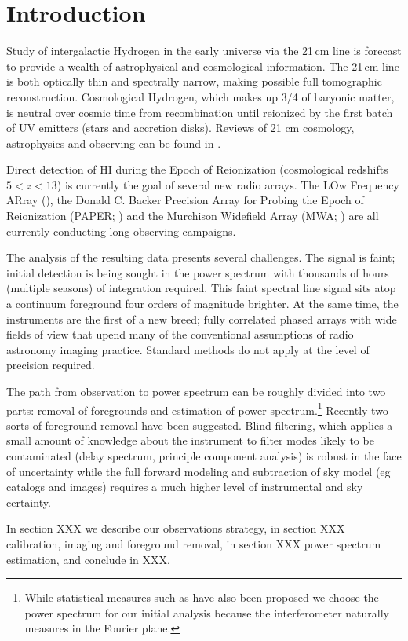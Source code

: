 \section{Introduction} 
  Study of intergalactic Hydrogen  in the early universe via the 21\,cm line is forecast to provide a wealth of astrophysical and cosmological information.  The 21\,cm line is both optically thin and spectrally narrow, making possible full tomographic reconstruction. Cosmological Hydrogen, which makes up 3/4 of baryonic matter, is neutral over cosmic time from recombination until reionized by the first batch of UV emitters (stars and accretion disks).  Reviews of 21 cm cosmology, astrophysics and observing can be found in \cite{Morales:2010p8093,Furlanetto:2006p2267,Pritchard:2012p9555,zaroubi2013epoch}.
  
Direct detection of HI during the Epoch of Reionization (cosmological redshifts $5<z<13$) is currently the goal of several new radio arrays. The LOw Frequency ARray (), the Donald C. Backer Precision Array for Probing the Epoch of Reionization (PAPER; ) and the Murchison Widefield Array (MWA; ) are all currently conducting long observing campaigns.

The analysis of the resulting data presents several challenges. The signal is faint; initial detection is being sought in the power spectrum with thousands of hours (multiple seasons) of integration required. This faint spectral line signal sits atop a continuum foreground four orders of magnitude brighter. At the same time, the instruments are the first of a new breed; fully correlated phased arrays with wide fields of view that upend many of the conventional assumptions of radio astronomy imaging practice. Standard methods do not apply at the level of precision required. 

The path from observation to power spectrum can be roughly divided into two parts: removal of foregrounds and estimation of power spectrum.\footnote{While statistical measures  such as \citet{Barkana:2008p2154} have also been proposed we choose the power spectrum for our initial analysis because the interferometer naturally measures in the Fourier plane.} Recently two sorts of foreground removal have been suggested. Blind filtering, which applies a small amount of knowledge about the instrument to filter modes likely to be contaminated (delay spectrum, principle component analysis) is robust in the face of uncertainty while the full forward modeling and subtraction of sky model (eg catalogs and images) requires a much higher level of instrumental and sky certainty.












In section XXX we describe our observations strategy, in section XXX calibration, imaging and foreground removal, in section XXX power spectrum estimation, and conclude in XXX.